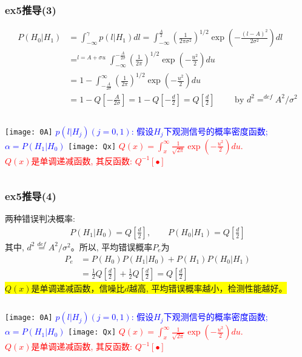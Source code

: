 \begin{frame}[shrink]
\frametitle{ex5推导(3)}
\begin{align*}
P(H_0|H_1)&=\int_{-\infty}^{\gamma}p(l|H_1)dl=\int_{-\infty}^{\frac{A}{2}}\left(\frac{1}{2\pi\sigma^2}\right)^{1/2}\exp\left(-\frac{(l-A)^2}{2\sigma^2}\right)dl\\
&\mathop{=}^{l=A+\sigma u}\int_{-\infty}^{-\frac{A}{2\sigma}}\left(\frac{1}{2\pi}\right)^{1/2}\exp\left(-\frac{u^2}{2}\right)du\\
&=1-\int_{-\frac{A}{2\sigma}}^{\infty}\left(\frac{1}{2\pi}\right)^{1/2}\exp\left(-\frac{u^2}{2}\right)du\\
&=1-Q[-\frac{A}{2\sigma}]=1-Q[-\frac{d}{2}]=Q[\frac{d}{2}]\qquad \text{ by } d^2\mathop{=}^{def}A^2/\sigma^2
\end{align*}
\begin{columns}
	\texttt{[image: 0A]}
	\scriptsize
	\textcolor{blue}{$p(l|H_j)(j=0,1)$: 假设$H_j$下观测信号的概率密度函数; $\alpha=P(H_1|H_0)$}
	\texttt{[image: Qx]}
	\scriptsize
	\textcolor{red}{$Q(x)=\int_{x}^{\infty}\frac{1}{\sqrt{2\pi}}\exp(-\frac{u^2}{2})du$.}\\
	\textcolor{red}{$Q(x)$是单调递减函数, 其反函数: $Q^{-1}[\bullet]$}
\end{columns}
\end{frame}

\begin{frame}[shrink]
\frametitle{ex5推导(4)}
两种错误判决概率:
\begin{align*}
P(H_1|H_0)=Q[\frac{d}{2}],\qquad P(H_0|H_1)=Q[\frac{d}{2}]
\end{align*}
其中, $d^2\mathop{=}\limits^{def}A^2/\sigma^2$。所以, 平均错误概率$P_e$为
\begin{align*}
P_e&=P(H_0)P(H_1|H_0)+P(H_1)P(H_0|H_1)\\
&=\frac{1}{2}Q[\frac{d}{2}]+\frac{1}{2}Q[\frac{d}{2}]=Q[\frac{d}{2}]
\end{align*}
\colorbox{yellow}{$Q(x)$是单调递减函数，信噪比$d$越高, 平均错误概率越小，检测性能越好。}
\begin{columns}
	\texttt{[image: 0A]}
	\scriptsize
	\textcolor{blue}{$p(l|H_j)(j=0,1)$: 假设$H_j$下观测信号的概率密度函数; $\alpha=P(H_1|H_0)$}
	\texttt{[image: Qx]}
	\scriptsize
	\textcolor{red}{$Q(x)=\int_{x}^{\infty}\frac{1}{\sqrt{2\pi}}\exp(-\frac{u^2}{2})du$.}\\
	\textcolor{red}{$Q(x)$是单调递减函数, 其反函数: $Q^{-1}[\bullet]$}
\end{columns}
\end{frame}

